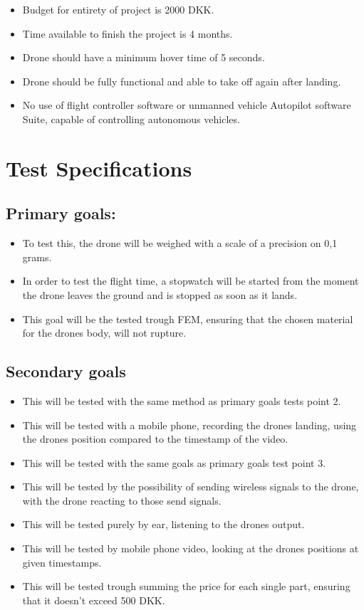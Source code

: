 \begin{itemize}
    \item
          Budget for entirety of project is 2000 DKK.
    \item
          Time available to finish the project is 4 months.
    \item
          Drone should have a minimum hover time of 5 seconds.
    \item
          Drone should be fully functional and able to take off again after landing.
    \item
          No use of flight controller software or unmanned vehicle Autopilot software Suite, capable of controlling autonomous vehicles.
\end{itemize}


\section {Test Specifications}
\subsection{Primary goals:}
\begin{itemize}
    \item
          To test this, the drone will be weighed with a scale of a precision on 0,1 grams.
    \item
          In order to test the flight time, a stopwatch will be started from the moment the drone leaves the ground and is stopped as soon as it lands.
    \item
          This goal will be the tested trough FEM, ensuring that the chosen material for the drones body, will not rupture.
\end{itemize}

\subsection{Secondary goals}
\begin{itemize}
    \item
          This will be tested with the same method as primary goals tests point 2.
    \item
          This will be tested with a mobile phone, recording the drones landing, using the drones position compared to the timestamp of the video.
    \item
          This will be tested with the same goals as primary goals test point 3.
    \item
          This will be tested by the possibility of sending wireless signals to the drone, with the drone reacting to those send signals.
    \item
          This will be tested purely by ear, listening to the drones output.
    \item
          This will be tested by mobile phone video, looking at the drones positions at given timestamps.
    \item
          This will be tested trough summing the price for each single part, ensuring that it doesn’t exceed 500 DKK.
\end{itemize}

